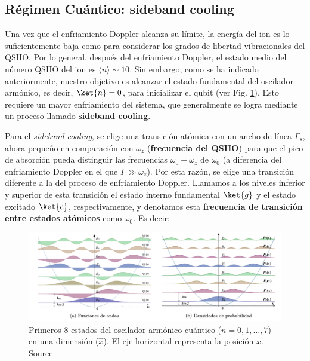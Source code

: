 \subsection{Régimen Cuántico: sideband cooling}


Una vez que el enfriamiento Doppler alcanza su límite, la energía del ion es lo suficientemente baja como para considerar los grados de libertad vibracionales del QSHO. Por lo general, después del enfriamiento Doppler, el estado medio del número QSHO del ion es $ \langle n \rangle \sim 10$. Sin embargo, como se ha indicado anteriormente, nuestro objetivo es alcanzar el estado fundamental del oscilador armónico, es decir, $\ket{n}=0$, para inicializar el qubit (ver Fig. \ref{Fig_Hardware_Oscilador_Armonico}). Esto requiere un mayor enfriamiento del sistema, que generalmente se logra mediante un proceso llamado \textbf{sideband cooling}. 

Para el \textit{sideband cooling}, se elige una transición atómica con un ancho de línea $\Gamma_s$, ahora pequeño en comparación con $\omega_z$ (\textbf{frecuencia del QSHO}) para que el pico de absorción pueda distinguir las frecuencias $\omega_0 \pm \omega_z$ de $\omega_0$ (a diferencia del enfriamiento Doppler en el que $\Gamma \gg \omega_z$). Por esta razón, se elige una transición diferente a la del proceso de enfriamiento Doppler. Llamamos a los niveles inferior y superior de esta transición el estado interno fundamental $\ket{g}$ y el estado excitado $\ket{e}$, respectivamente, y denotamos esta \textbf{frecuencia de transición entre estados atómicos} como $\omega_0$. Es decir:

\begin{figure}[t]
  \centering 
  \includegraphics[width=1\linewidth]{Figuras/Fig_Hardware_Oscilador_Armonico.png}
  \caption{Primeros $8$ estados del oscilador armónico cuántico ($n=0,1, \dots,7$) en una dimensión ($\hat{x}$). El eje horizontal representa la posición $x$. Source \cite{bib_Hardware_Wiki_QHO}}
  \label{Fig_Hardware_Oscilador_Armonico}
\end{figure}

